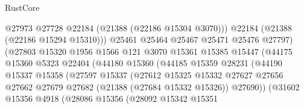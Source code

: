 \begin{lexlean}{RustCore}
\begin{coremodule}
                                        @27973
                                        @27728
                                        @22184
                                        (@21388 (@22186 @15304 @3070)))
                                      @22184
                                      (@21388 (@22186 @15294 @15310)))
                                    @25461
                                    @25464
                                    @25467
                                    @25471
                                    @25476
                                    @27797)
                                  (@27803
                                    @15320
                                    @1956
                                    @1566
                                    @121
                                    @3070
                                    @15361
                                    @15385
                                    @15447
                                    (@44175
                                      @15360
                                      @5323
                                      @22404
                                      (@44180
                                        @15360
                                        (@44185
                                          @15359
                                          @28231
                                          (@44190
                                            @15337
                                            @15358
                                            (@27597
                                              @15337
                                              (@27612
                                                @15325
                                                @15332
                                                @27627
                                                @27656
                                                @27662
                                                @27679
                                                @27682
                                                (@21388 (@27684 @15332 @15326))
                                                @27690))
                                            (@31602
                                              @15356
                                              @4918
                                              (@28086
                                                @15356
                                                (@28092
                                                  @15342
                                                  @15351

\end{coremodule}
\end{lexlean}

